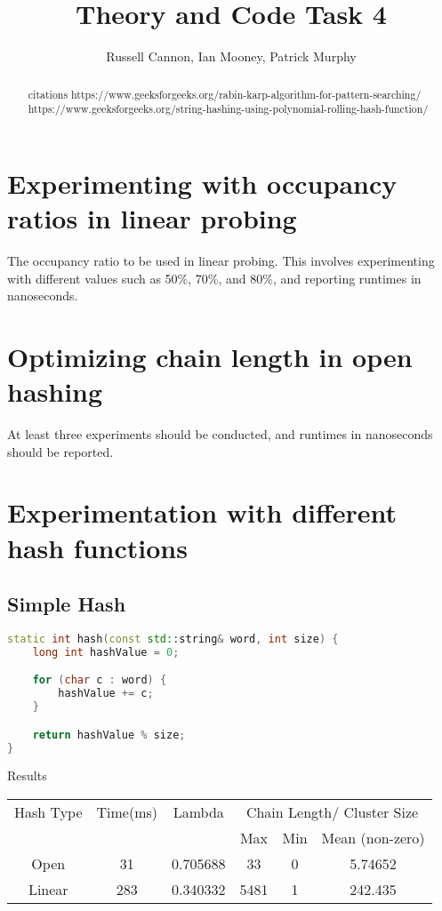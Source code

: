 \documentclass[12pt]{article}
\begin{document}
\title{Theory and Code Task 4}
\author{Russell Cannon, Ian Mooney, Patrick Murphy}

\maketitle
\singlespacing

\begin{abstract}
\begin{center}
citations
https://www.geeksforgeeks.org/rabin-karp-algorithm-for-pattern-searching/
https://www.geeksforgeeks.org/string-hashing-using-polynomial-rolling-hash-function/
\end{center}
\end{abstract}

\newpage

\section{Experimenting with occupancy ratios in linear probing}
The occupancy ratio to be used in linear probing. This involves experimenting with different values such
as 50\%, 70\%, and 80\%, and reporting runtimes in nanoseconds.

\section {Optimizing chain length in open hashing}
At least three experiments should be conducted, and runtimes
in nanoseconds should be reported.

\section{Experimentation with different hash functions}
\subsection{Simple Hash}
\begin{lstlisting}[language=C++]
static int hash(const std::string& word, int size) {
    long int hashValue = 0;

    for (char c : word) {
        hashValue += c;
    }

    return hashValue % size;
}
\end{lstlisting}

\begin{center}
Results\\
\begin{tabular}{|c|c|c|c|c|c|}
\hline
Hash Type & Time(ms) & Lambda & \multicolumn{3}{|c|}{Chain Length/ Cluster Size} \\
 & & & Max & Min & Mean (non-zero) \\
\hline
Open & 31 & 0.705688 & 33 & 0 & 5.74652\\
Linear & 283 & 0.340332 & 5481 & 1 & 242.435\\
\hline
\end{tabular}
\end{center}
\end{document}
